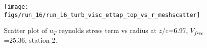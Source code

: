 \begin{figure}[H]
\centering
\texttt{[image: figs/run\_16/run\_16\_turb\_visc\_ettap\_top\_vs\_r\_meshscatter]}
\caption{Scatter plot of $
u_T$ reynolds stress term vs radius at $z/c$=6.97, $V_{free}$=25.36, station 2.}
\label{fig:run_16_turb_visc_ettap_top_vs_r_meshscatter}
\end{figure}


